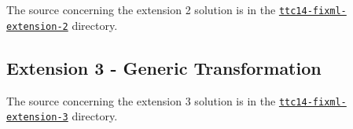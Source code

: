 The source concerning the extension 2 solution is in the \href{https://github.com/fikovnik/ttc14-fixml-sigma/tree/master/ttc14-fixml-extension-2}{\texttt{ttc14-fixml-extension-2}} directory.

\subsection{Extension 3 - Generic Transformation}
\label{sec:Extension3}



The source concerning the extension 3 solution is in the \href{https://github.com/fikovnik/ttc14-fixml-sigma/tree/master/ttc14-fixml-extension-3}{\texttt{ttc14-fixml-extension-3}} directory.
